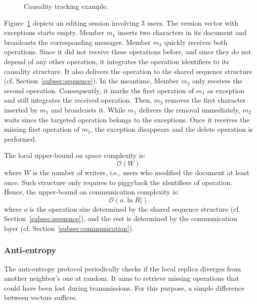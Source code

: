 \begin{figure}
  \centering
  
  \caption{\label{fig:timeline} Causality tracking example.}
\end{figure}

Figure~\ref{fig:timeline} depicts an editing session involving 3 users. The
version vector with exceptions starts empty. Member $m_1$ inserts two characters
in its document and broadcasts the corresponding messages. Member $m_3$ quickly
receives both operations. Since it did not receive these operations before, and
since they do not depend of any other operation, it integrates the operation
identifiers to its causality structure. It also delivers the operation to the
shared sequence structure (cf. Section~\ref{subsec:sequence}). In the meantime,
Member $m_2$ only receives the second operation. Consequently, it marks the
first operation of $m_1$ as exception and still integrates the received
operation. Then, $m_3$ removes the first character inserted by $m_1$ and
broadcasts it. While $m_1$ delivers the removal immediately, $m_2$ waits since
the targeted operation belongs to the exceptions. Once it receives the missing
first operation of $m_1$, the exception disappears and the delete operation is
performed.

The local upper-bound on space complexity is:
\begin{equation}
  \mathcal{O}(W)
\end{equation}
where $W$ is the number of writers, i.e., users who modified the
document at least once.  Such structure only requires to piggyback the
identifiers of operation. Hence, the upper-bound on communication complexity
is:
\begin{equation}
  \mathcal{O}(o.\ln R|)
\end{equation}
where $o$ is the operation size determined by the shared sequence structure
(cf. Section~\ref{subsec:sequence}), and the rest is determined by the
communication layer (cf. Section~\ref{subsec:communication}).

\subsubsection{Anti-entropy} 

The anti-entropy protocol periodically checks if the local replica diverges from
another neighbor's one at random. It aims to retrieve missing operations that
could have been lost during transmissions. For this purpose, a simple difference
between vectors suffices.

